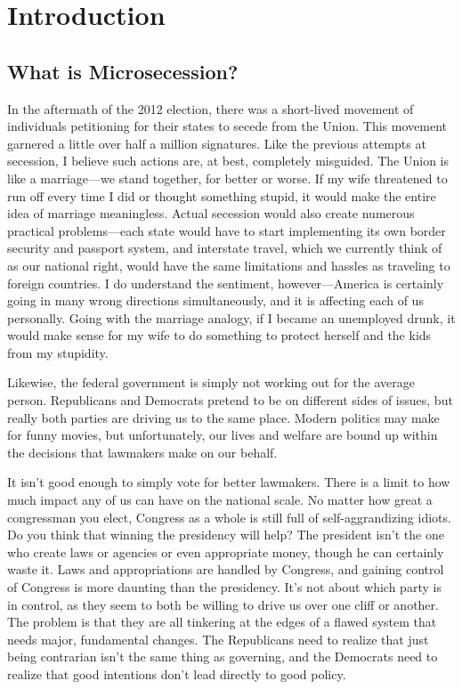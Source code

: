 \chapter*{Introduction}

\section{What is Microsecession?}

In the aftermath of the 2012 election, there was a short-lived movement
of individuals petitioning for their states to secede from the
Union. This movement
garnered a little over half a million signatures. Like the previous
attempts at secession, I believe such actions are, at best, completely
misguided.   The Union is like a marriage---we stand together,
for better or worse.  If my wife threatened to run off
every time I did or thought something stupid, it would make the entire
idea of marriage meaningless.  Actual secession would also create
numerous practical problems---each state would have to start implementing
its own border security and passport system, and interstate travel, which
we currently think of as our national right, would have the same limitations
and hassles as traveling to foreign countries.  I do understand the
sentiment, however---America is certainly going in many wrong directions
simultaneously, and it is affecting each of us personally.  Going with 
the marriage analogy, if I became an unemployed drunk, it would make sense
for my wife to do something to protect herself and the kids from my stupidity.

Likewise, the federal government is simply not working out for the average person.
Republicans and Democrats pretend to be on different sides of issues,
but really both
parties are driving us to the same place. Modern politics
may make for funny
movies, but unfortunately, our lives and welfare are bound up within
the decisions that lawmakers make on our behalf.

It isn’t good enough to simply vote for better lawmakers. There is a
limit to how much impact any of us can have on the national scale. No
matter how great a congressman you elect, Congress as a whole is still
full of self-aggrandizing idiots. Do you think that winning the
presidency will help?  The president isn’t the one who create laws
or agencies or even appropriate money, though he can certainly waste it. 
Laws and appropriations are handled by Congress, and gaining control
of Congress is more daunting than the presidency.  It's not about which
party is in control, as they seem to both be willing to drive us over
one cliff or another.  The problem is that they are all tinkering at
the edges of a flawed system that needs major, fundamental changes.
The Republicans need to realize that just being contrarian isn't 
the same thing as governing, and the Democrats need to realize that 
good intentions don't lead directly to good policy.


